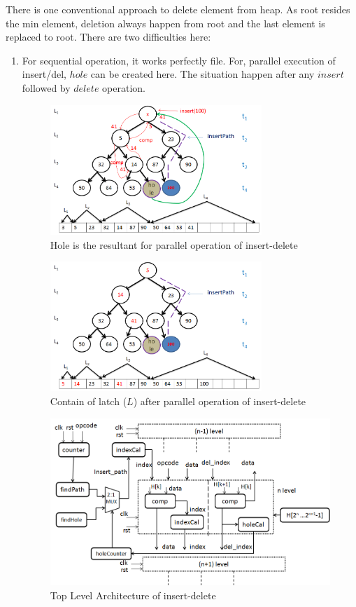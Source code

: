 \documentclass[10pt, conference, compsocconf]{IEEEtran}
\begin{document}
There is one conventional approach to delete element from heap. As root resides the min element, deletion always happen from root and the last element is replaced to root. There are two difficulties here:
\begin{enumerate}
\item For sequential operation, it works perfectly file. For, parallel execution of insert/del, $hole$ can be created here. The situation happen after any $insert$ followed by $delete$ operation.
\begin{figure}[h]
  \centering
  \includegraphics[width=8cm]{Figures/8.png}
      \caption{Hole is the resultant for parallel operation of insert-delete}
    \label{fig8}
\end{figure}

\begin{figure}[h]
  \centering
  \includegraphics[width=8cm]{Figures/9.png}
      \caption{Contain of latch ($L$) after parallel operation of insert-delete}
    \label{fig9}
\end{figure}

\begin{figure}[!ht]
  \centering
  \includegraphics[width=12cm]{Figures/2.png}
      \caption{Top Level Architecture of insert-delete}
    \label{fig2}
\end{figure}


\end{enumerate}
\end{document}

